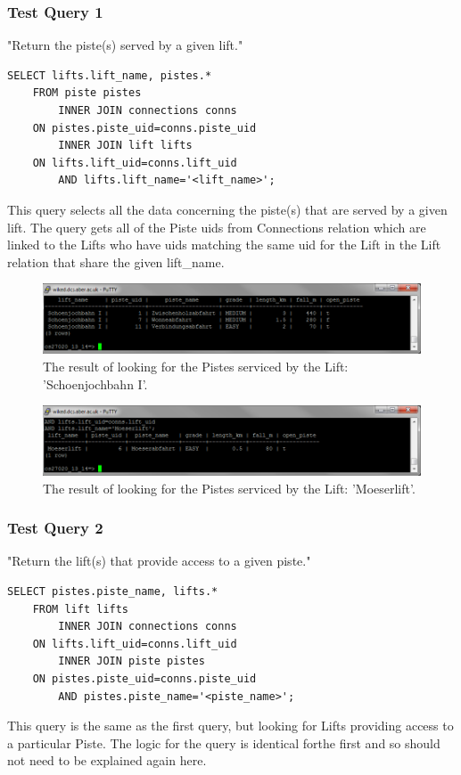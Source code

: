 \documentclass[11pt]{scrartcl} %
\begin{document}
\subsubsection{Test Query 1}
"Return the piste(s) served by a given lift."
\begin{lstlisting}
SELECT lifts.lift_name, pistes.*
	FROM piste pistes
		INNER JOIN connections conns
	ON pistes.piste_uid=conns.piste_uid
		INNER JOIN lift lifts
	ON lifts.lift_uid=conns.lift_uid
		AND lifts.lift_name='<lift_name>';
\end{lstlisting}
This query selects all the data concerning the piste(s) that are served by a given lift. The query gets all of the Piste uids from Connections relation which are linked to the Lifts who have uids matching the same uid for the Lift in the Lift relation that share the given lift\_name.

\begin{figure}[H]
  \centering
    \includegraphics[width=1\textwidth]{IMG/query_1_1.png}
 \caption{The result of looking for the Pistes serviced by the Lift: 'Schoenjochbahn I'.}
\end{figure}

\begin{figure}[H]
  \centering
    \includegraphics[width=1\textwidth]{IMG/query_1_2.png}
 \caption{The result of looking for the Pistes serviced by the Lift: 'Moeserlift'.}
\end{figure}

\subsubsection{Test Query 2}
"Return the lift(s) that provide access to a given piste."
\begin{lstlisting}
SELECT pistes.piste_name, lifts.*
	FROM lift lifts
		INNER JOIN connections conns
	ON lifts.lift_uid=conns.lift_uid
		INNER JOIN piste pistes
	ON pistes.piste_uid=conns.piste_uid
		AND pistes.piste_name='<piste_name>';
\end{lstlisting}
This query is the same as the first query, but looking for Lifts providing access to a particular Piste. The logic for the query is identical forthe first and so should not need to be explained again here.
\end{document}
